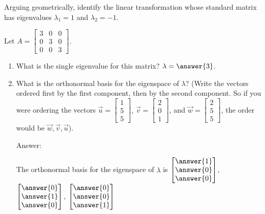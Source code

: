 \documentclass{ximera}
\begin{document}
    
\begin{problem}\label{prob:eigenvalgeometry}
Arguing geometrically, identify the linear transformation whose standard matrix has eigenvalues $\lambda_1=1$ and $\lambda_2=-1$.
\begin{multipleChoice}
    \end{multipleChoice}
\end{problem}
    
\begin{problem}\label{prob:eigvalvectorsofdiagmat} Let $A=\begin{bmatrix} 3&0&0\\0&3&0\\0&0&3\end{bmatrix}$.  
  
\begin{enumerate}
  \item What is the single eigenvalue for this matrix? $\lambda=\answer{3}$.
  \item What is the orthonormal basis for the eigenspace of $\lambda$? (Write the vectors ordered first by the first component, then by the second component. So if you were ordering the vectors $\vec{u}=\begin{bmatrix}
  1\\
  5\\
  5
  \end{bmatrix}$, $\vec{v}=\begin{bmatrix}
    2\\
    0\\
    1
  \end{bmatrix}$, and $\vec{w}=\begin{bmatrix}
    2\\
    5\\
    5
  \end{bmatrix}$, the order would be $\vec{w},\vec{v},\vec{u}$).


  Answer:

  The orthonormal basis for the eigenspace of $\lambda$ is $\begin{bmatrix}
    \answer{1}\\
    \answer{0}\\
    \answer{0}
  \end{bmatrix}$, $\begin{bmatrix}
    \answer{0}\\
    \answer{1}\\
    \answer{0}
  \end{bmatrix}$, $\begin{bmatrix}
    \answer{0}\\
    \answer{0}\\
    \answer{1}
  \end{bmatrix}$

\end{enumerate}


\end{problem}
    
\end{document}
